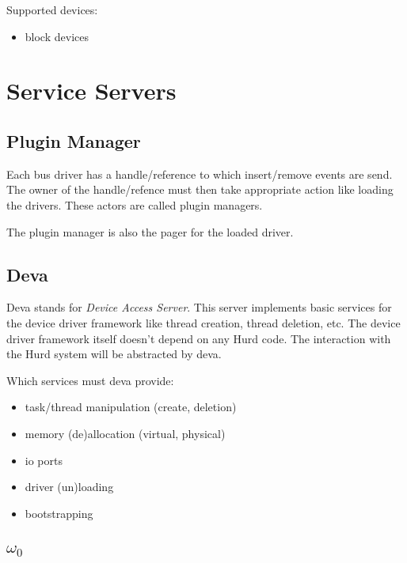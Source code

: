 Supported devices:
\begin{itemize}
\item block devices
\end{itemize}


\section{Service Servers}

\subsection{Plugin Manager}

Each bus driver has a handle/reference to which insert/remove events
are send.  The owner of the handle/refence must then take
appropriate action like loading the drivers.  These actors are
called plugin managers.

The plugin manager is also the pager for the loaded driver.

\begin{comment}
Obviously, the plugin manager needs some sort of exec format
support.  Maybe it's own ELF loader.
\end{comment}

\subsection{Deva}

Deva stands for \emph{Device Access Server}.  This server implements basic
services for the device driver framework like thread creation, thread
deletion, etc.  The device driver framework itself doesn't depend on
any Hurd code.  The interaction with the Hurd system will be
abstracted by deva. 

Which services must deva provide:
\begin{itemize}
\item task/thread manipulation (create, deletion)
\item memory (de)allocation (virtual, physical)
\item io ports 
\item driver (un)loading
\item bootstrapping
\end{itemize}


\subsection{$\omega_0$}

